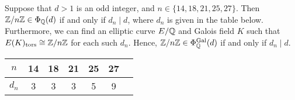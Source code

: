 \begin{lem} \label{lem:oddgalfinp}
Suppose that $d > 1$ is an odd integer, and $n \in \{ 14, 18, 21, 25, 27 \}$. Then $\mathbb{Z}/n\mathbb{Z} \in \Phi_{\mathbb{Q}}(d)$ if and only if $d_n \mid d$, where $d_n$ is given in the table below. Furthermore, we can find an elliptic curve $E/\mathbb{Q}$ and Galois field $K$ such that $E(K)_{\text{tors}} \cong \mathbb{Z}/n\mathbb{Z}$ for each such $d_n$. Hence, $\mathbb{Z}/n\mathbb{Z} \in \Phi_{\mathbb{Q}}^{\operatorname{Gal}}(d)$ if and only if $d_n \mid d$.
	\begin{table}[!ht]
	\centering
	\begin{tabular}{|c||cccccc|} \hline
	$n$ & 14 & 18 & 21 & 25 & 27 \\ \hline
	$d_n$ & 3 & 3 & 3 & 5 & 9 \\ \hline
	\end{tabular}
	\end{table}
\end{lem}

